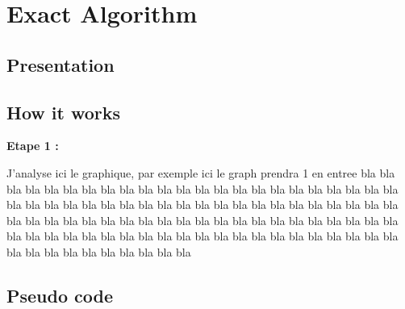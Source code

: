 
\section{Exact Algorithm}


    \subsection{Presentation}


\subsection{How it works}

    \hspace*{1cm} \textbf{Etape 1 :}
    \\
        \hspace{1em}
    \begin{minipage}{29em}
            J'analyse ici le graphique, par exemple ici le graph prendra 1 en entree bla bla bla bla bla bla bla bla bla bla bla bla bla bla bla bla bla bla bla bla bla bla bla bla bla bla bla bla bla bla bla bla bla bla bla bla bla bla bla bla bla bla bla bla bla bla bla bla bla bla bla bla bla bla bla bla bla bla bla bla bla bla bla bla bla bla bla bla bla bla bla bla bla bla bla bla bla bla bla bla bla bla bla bla bla bla bla bla bla bla bla bla bla bla bla bla
    \end{minipage}


\subsection{Pseudo code}

